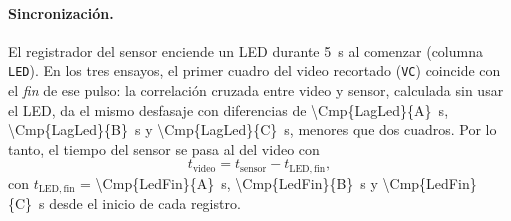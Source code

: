 \paragraph{Sincronización.} El registrador del sensor enciende un LED durante \SI{5}{\second} al
comenzar (columna \texttt{LED}). En los tres ensayos, el primer cuadro del video recortado
(\texttt{VC}) coincide con el \emph{fin} de ese pulso: la correlación cruzada entre video y sensor,
calculada sin usar el LED, da el mismo desfasaje con diferencias de \SI{\Cmp{LagLed}{A}}{\second},
\SI{\Cmp{LagLed}{B}}{\second} y \SI{\Cmp{LagLed}{C}}{\second}, menores que dos cuadros. Por lo tanto,
el tiempo del sensor se pasa al del video con
\begin{equation}
  t_{\mathrm{video}} = t_{\mathrm{sensor}} - t_{\mathrm{LED,fin}},
\end{equation}
con $t_{\mathrm{LED,fin}}$ = \SI{\Cmp{LedFin}{A}}{\second}, \SI{\Cmp{LedFin}{B}}{\second} y
\SI{\Cmp{LedFin}{C}}{\second} desde el inicio de cada registro.
